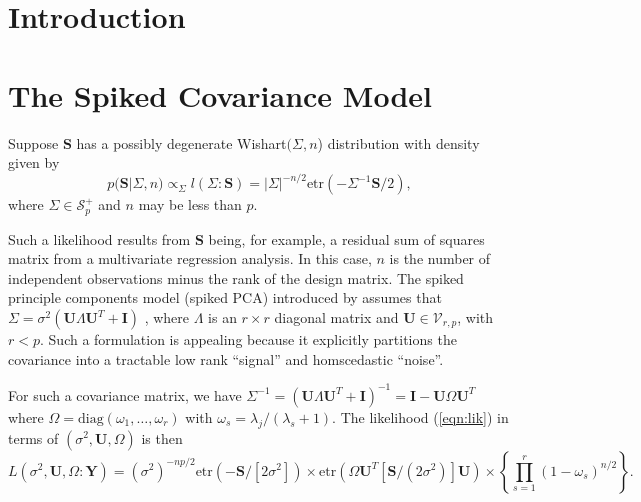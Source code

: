 \documentclass{article}
\newcommand{\bl}[1]{{\mathbf #1}}
\newcommand{\etr}{\text{etr}}
\begin{document}
\section{Introduction}



\section{The Spiked Covariance Model}  
Suppose $\bl S$ has a possibly degenerate Wishart$(\Sigma,n$) 
distribution with density 
given by 
\begin{equation} 
p(\bl S | \Sigma, n) \propto_{\Sigma} l(\Sigma:\bl S) =  |\Sigma|^{-n/2} \text{etr}( - \Sigma^{-1} \bl S/2 ) ,  
\label{eqn:lik}
\end{equation}
where $\Sigma \in \mathcal S_p^+$ and $n$ may be less than $p$. 

 
Such a likelihood results from $\bl S$ being, for example, a residual 
sum of squares matrix from a multivariate regression analysis. In  this case,
$n$ is the number of independent observations minus the 
rank of the design matrix. 
The spiked principle 
components model (spiked PCA) introduced by \citet{Johnstone2001} assumes that 
$\Sigma = \sigma^2 (  \bl U  \Lambda  \bl U^T  + \bl I )$  ,  
where $\Lambda$ is an $r\times r$ diagonal matrix and 
$\bl U \in \mathcal V_{r,p}$, with 
$r<p$. Such a formulation is appealing because it explicitly
partitions the covariance into a tractable low rank ``signal'' and
homscedastic ``noise''.  



For such a covariance matrix, we have
$\Sigma^{-1} = (\bl U \Lambda \bl U^T + \bl I )^{-1} = \bl I - \bl U
\Omega \bl U^T $
where $\Omega = \text{diag}(\omega_1,\ldots, \omega_r)$ with
$\omega_s = \lambda_j/(\lambda_s+1)$.  The likelihood (\ref{eqn:lik})
in terms of $(\sigma^2,\bl U, \Omega)$ is then
\begin{equation}
L(\sigma^2,\bl U , \Omega : \bl Y)  = 
(\sigma^2)^{-np/2} \etr(-\bl S/[2\sigma^2]) \times 
   \etr( \Omega \bl U^T [\bl S/(2\sigma^2)] \bl U ) \times  
 \left\{ \prod_{s=1}^r (1-\omega_s)^{n/2} \right \} .  
\label{eqn:rplik}
\end{equation}
\end{document}
